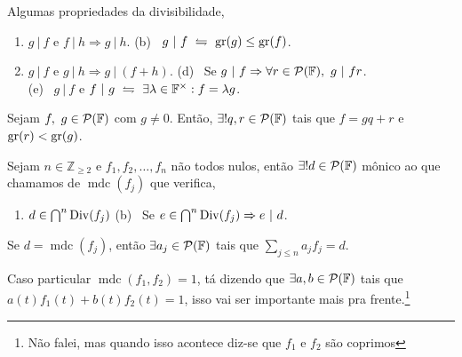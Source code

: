 \begin{proposition}
    \label{prop:0.2}
    Algumas propriedades da divisibilidade, 
    \begin{enumerate}[left = 1cm, label = (\alph*)]
        \item \(g \ | \ f\) e \(f \ | \ h \Rightarrow g\ | \ h \).\hspace{3cm} (b) \ \(g \ | \ f \ \leftrightharpoons\  \operatorname{gr}(g) \leq \operatorname{gr}(f)\).   
        \item[(c)] \(g\ | \ f \) e \(g \ | \ h\Rightarrow g\ | \ (f+h)\). \hspace{1.6cm }  (d) \ Se \(g\ | \ f \Rightarrow  \forall r \in \mathcal{P}(\mathbb{F}), \   g \ | \ f r\).  \vspace{0.4cm}\\ 
        \- \hspace{2.7cm}(e) \ \(g \ | \ f\) e \(f \ | \ g \ \leftrightharpoons \ \exists \lambda \in \mathbb{F}^{\times}: f = \lambda g\).  
    \end{enumerate}
\end{proposition}

\theoremnum{ \ \hspace{-0.5cm}}
\begin{theorem}
    Sejam \(f, \ g \in \mathcal{P}(\mathbb{F})\) com \(g\neq 0\). Então, \(\exists ! q, r \in \mathcal{P}(\mathbb{F}) \) tais que \(f = gq +r\) e \( \operatorname{gr}(r) < \operatorname{gr}(g)\). 
\end{theorem}

\newcommand{\mdc}{\operatorname{mdc}}
\theoremnum{\ \hspace{-0.3cm}}
\begin{theorem}
    Sejam \(n\in \mathbb{Z}_{\geq 2}\) e \(f_1, f_2, \ldots, f_n\) não todos nulos, então \(\exists ! d \in \mathcal{P}(\mathbb{F})\) mônico ao que chamamos de \(\mdc(f_j)\) que verifica, 
    \begin{enumerate}[label= (\alph*), left = 2cm]
        \item \(d \in \bigcap^n \operatorname{Div}(f_j)\) \hspace{1.8cm} (b) \ Se \(e \in \bigcap^n \operatorname{Div}(f_j)  \Rightarrow e \ | \ d\). 
    \end{enumerate}
\end{theorem}

\begin{theorem}
    \label{thm:bezout}
    Se \(d = \mdc(f_j)\), então \(\exists a_j \in \mathcal{P}(\mathbb{F})\) tais que \(\sum_{j\leq n} a_j f_j = d\). 
\end{theorem}

\begin{note}
    Caso particular \(\mdc(f_1, f_2)=1\), tá dizendo que \(\exists a, b \in \mathcal{P}(\mathbb{F})\) tais que \(a(t)f_1(t) + b(t)f_2(t)= 1\), isso vai ser importante mais pra frente.\footnote{Não falei, mas quando isso acontece diz-se que \(f_1\) e \(f_2\) são coprimos}
\end{note}